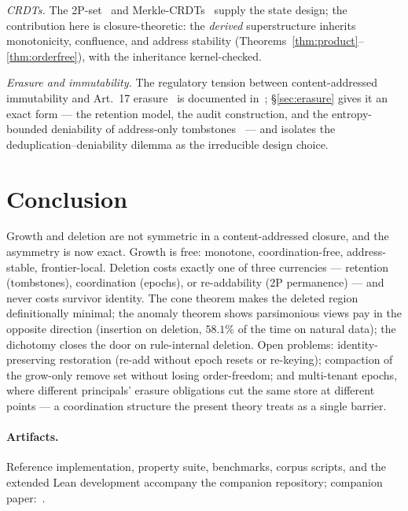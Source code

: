 \documentclass[11pt]{article}
\theoremstyle{definition}
\theoremstyle{remark}
\begin{document}
\emph{CRDTs.} The 2P-set~\cite{Shapiro11} and Merkle-CRDTs~\cite{Sanjuan20} supply the state design; the contribution here is closure-theoretic: the \emph{derived} superstructure inherits monotonicity, confluence, and address stability (Theorems~\ref{thm:product}--\ref{thm:orderfree}), with the inheritance kernel-checked.

\emph{Erasure and immutability.} The regulatory tension between content-addressed immutability and Art.~17 erasure~\cite{GDPR} is documented in~\cite{Finck19}; \S\ref{sec:erasure} gives it an exact form --- the retention model, the audit construction, and the entropy-bounded deniability of address-only tombstones~\cite{RogawayShrimpton04} --- and isolates the deduplication--deniability dilemma as the irreducible design choice.

\section{Conclusion}\label{sec:conclusion}

Growth and deletion are not symmetric in a content-addressed closure, and the asymmetry is now exact. Growth is free: monotone, coordination-free, address-stable, frontier-local. Deletion costs exactly one of three currencies --- retention (tombstones), coordination (epochs), or re-addability (2P permanence) --- and never costs survivor identity. The cone theorem makes the deleted region definitionally minimal; the anomaly theorem shows parsimonious views pay in the opposite direction (insertion on deletion, $58.1\%$ of the time on natural data); the dichotomy closes the door on rule-internal deletion. Open problems: identity-preserving restoration (re-add without epoch resets or re-keying); compaction of the grow-only remove set without losing order-freedom; and multi-tenant epochs, where different principals' erasure obligations cut the same store at different points --- a coordination structure the present theory treats as a single barrier.

\paragraph{Artifacts.} Reference implementation, property suite, benchmarks, corpus scripts, and the extended Lean development accompany the companion repository; companion paper:~\cite{growth}.
\end{document}
